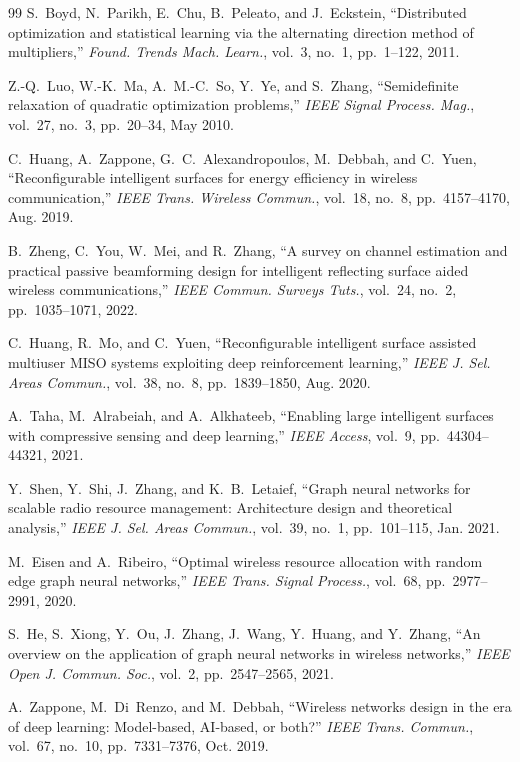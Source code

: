 \documentclass[conference]{IEEEtran}
\begin{document}
\begin{thebibliography}{99}
S.~Boyd, N.~Parikh, E.~Chu, B.~Peleato, and J.~Eckstein, ``Distributed optimization and statistical learning via the alternating direction method of multipliers,'' \emph{Found. Trends Mach. Learn.}, vol.~3, no.~1, pp.~1--122, 2011.

Z.-Q.~Luo, W.-K.~Ma, A.~M.-C.~So, Y.~Ye, and S.~Zhang, ``Semidefinite relaxation of quadratic optimization problems,'' \emph{IEEE Signal Process. Mag.}, vol.~27, no.~3, pp.~20--34, May 2010.

C.~Huang, A.~Zappone, G.~C.~Alexandropoulos, M.~Debbah, and C.~Yuen, ``Reconfigurable intelligent surfaces for energy efficiency in wireless communication,'' \emph{IEEE Trans. Wireless Commun.}, vol.~18, no.~8, pp.~4157--4170, Aug. 2019.

B.~Zheng, C.~You, W.~Mei, and R.~Zhang, ``A survey on channel estimation and practical passive beamforming design for intelligent reflecting surface aided wireless communications,'' \emph{IEEE Commun. Surveys Tuts.}, vol.~24, no.~2, pp.~1035--1071, 2022.

C.~Huang, R.~Mo, and C.~Yuen, ``Reconfigurable intelligent surface assisted multiuser MISO systems exploiting deep reinforcement learning,'' \emph{IEEE J. Sel. Areas Commun.}, vol.~38, no.~8, pp.~1839--1850, Aug. 2020.

A.~Taha, M.~Alrabeiah, and A.~Alkhateeb, ``Enabling large intelligent surfaces with compressive sensing and deep learning,'' \emph{IEEE Access}, vol.~9, pp.~44304--44321, 2021.

Y.~Shen, Y.~Shi, J.~Zhang, and K.~B.~Letaief, ``Graph neural networks for scalable radio resource management: Architecture design and theoretical analysis,'' \emph{IEEE J. Sel. Areas Commun.}, vol.~39, no.~1, pp.~101--115, Jan. 2021.

M.~Eisen and A.~Ribeiro, ``Optimal wireless resource allocation with random edge graph neural networks,'' \emph{IEEE Trans. Signal Process.}, vol.~68, pp.~2977--2991, 2020.

S.~He, S.~Xiong, Y.~Ou, J.~Zhang, J.~Wang, Y.~Huang, and Y.~Zhang, ``An overview on the application of graph neural networks in wireless networks,'' \emph{IEEE Open J. Commun. Soc.}, vol.~2, pp.~2547--2565, 2021.

A.~Zappone, M.~Di~Renzo, and M.~Debbah, ``Wireless networks design in the era of deep learning: Model-based, AI-based, or both?'' \emph{IEEE Trans. Commun.}, vol.~67, no.~10, pp.~7331--7376, Oct. 2019.


\end{thebibliography}
\end{document}
